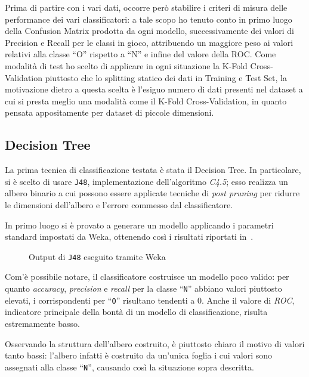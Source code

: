 
Prima di partire con i vari dati, occorre però stabilire i criteri di misura delle performance dei vari classificatori:
a tale scopo ho tenuto conto in primo luogo della Confusion Matrix prodotta da ogni modello, successivamente dei valori di Precision e Recall per le classi in gioco, attribuendo un maggiore peso ai valori relativi alla classe ``O'' rispetto a ``N'' e infine del valore della ROC\@.
Come modalità di test ho scelto di applicare in ogni situazione la K-Fold Cross-Validation piuttosto che lo splitting statico dei dati in Training e Test Set, la motivazione dietro a questa scelta è l'esiguo numero di dati presenti nel dataset a cui si presta meglio una modalità come il K-Fold Cross-Validation,
in quanto pensata appositamente per dataset di piccole dimensioni.


\subsection{Decision Tree}\label{subsec:tree}

La prima tecnica di classificazione testata è stata il Decision Tree.
In particolare, si è scelto di usare \texttt{J48}, implementazione dell'algoritmo \emph{C4.5};
esso realizza un albero binario a cui possono essere applicate tecniche di \emph{post pruning}
per ridurre le dimensioni dell'albero e l'errore commesso dal classificatore.

In primo luogo si è provato a generare un modello applicando i parametri standard impostati da Weka, ottenendo così i risultati riportati in~.

\begin{figure}[H]
  \centering
  \caption{Output di \texttt{J48} eseguito tramite Weka}%
  \label{fig:j48}
\end{figure}

Com'è possibile notare, il classificatore costruisce un modello poco valido:
per quanto \emph{accuracy}, \emph{precision} e \emph{recall} per la classe ``\texttt{N}'' abbiano valori piuttosto elevati,
i corrispondenti per ``\texttt{O}'' risultano tendenti a \(0\).
Anche il valore di \emph{ROC}, indicatore principale della bontà di un modello di classificazione, risulta estremamente basso.

Osservando la struttura dell'albero costruito, è piuttosto chiaro il motivo di valori tanto bassi:
l'albero infatti è costruito da un'unica foglia i cui valori sono assegnati alla classe ``\texttt{N}'', causando così la situazione sopra descritta.

